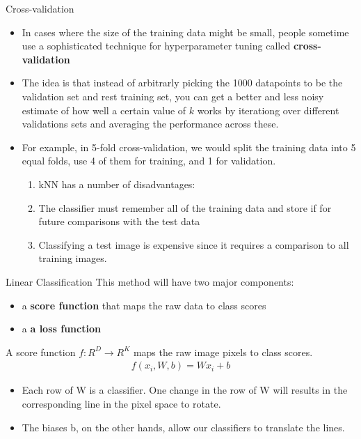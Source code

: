 \documentclass[10pt,mathserif]{beamer}
\begin{document}
\begin{frame}{Cross-validation}
\begin{itemize}
\item In cases where the size of the training data might be small, people sometime use a sophisticated
technique for hyperparameter tuning called \textbf{cross-validation}
\item The idea is that instead of arbitrarly picking the 1000 datapoints to be the validation set and
rest training set, you can get a better and less noisy estimate of how well a certain value of $k$ works by iterationg over different validations sets and averaging the performance across these.
\item For example, in 5-fold  cross-validation, we would split the training data into 5 equal folds, 
use 4 of them for training, and 1 for validation.
\begin{enumerate}
\item kNN has a number of disadvantages:
\item The classifier must remember all of the training data and store if for future comparisons with the test data
\item Classifying a test image is expensive since it requires a comparison to all training images.
\end{enumerate}
\end{itemize}
\end{frame}

\begin{frame}{Linear Classification}
This method will have two major components:
\begin{itemize}
\item a \textbf{score function} that maps the raw data to class scores
\item a \textbf{a loss function} 
\end{itemize}
A score function $f: R^D\rightarrow R^K$ maps the raw image pixels to class scores.
\begin{align}
f(x_i, W,b) = Wx_i + b
\end{align}
\begin{itemize}
\item Each row of W is a classifier. One change in the row of W will results in the corresponding line
in the pixel space to rotate.
\item The biases b, on the other hands, allow our classifiers to translate the lines. 
\end{itemize}
\end{frame}
\end{document}
